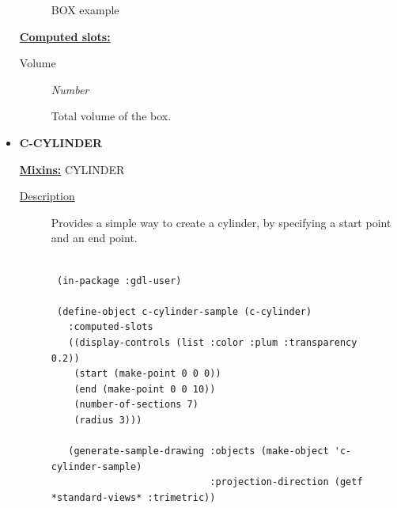 \documentclass [11pt]{book}
\begin{document}
\begin{itemize}
\begin{figure}
\caption{BOX example}

\label{fig:BOX}

\end{figure}





\textbf{
\underline{Computed slots:}}

\begin{description}

\item [Volume]
\emph{Number}

 Total volume of the box.




\end{description}







\item {}
\textbf{C-CYLINDER}


\textbf{
\underline{Mixins:}} CYLINDER





\begin{description}

\item [
\underline{Description}]


Provides a simple way to create a cylinder, by specifying a start point and an end point.



\end{description}




\begin{figure}
\begin{lrbox}{\boxedverb}
\begin{minipage}{\linewidth}
{\small

\begin{verbatim}

 (in-package :gdl-user)

 (define-object c-cylinder-sample (c-cylinder)
   :computed-slots
   ((display-controls (list :color :plum :transparency 0.2))
    (start (make-point 0 0 0))
    (end (make-point 0 0 10))
    (number-of-sections 7)
    (radius 3)))

   (generate-sample-drawing :objects (make-object 'c-cylinder-sample)
                            :projection-direction (getf *standard-views* :trimetric))
   



\end{verbatim}}
\end{minipage}
\end{lrbox}
\end{figure}
\end{itemize}
\end{document}
